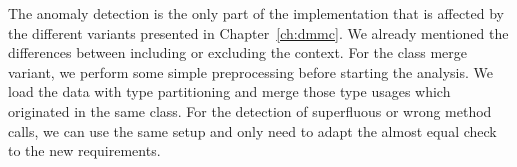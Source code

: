 The anomaly detection is the only part of the implementation that is affected by the different variants presented in Chapter~\ref{ch:dmmc}.
We already mentioned the differences between including or excluding the context.
For the class merge variant, we perform some simple preprocessing before starting the analysis.
We load the data with type partitioning and merge those type usages which originated in the same class.
For the detection of superfluous or wrong method calls, we can use the same setup and only need to adapt the almost equal check to the new requirements.

